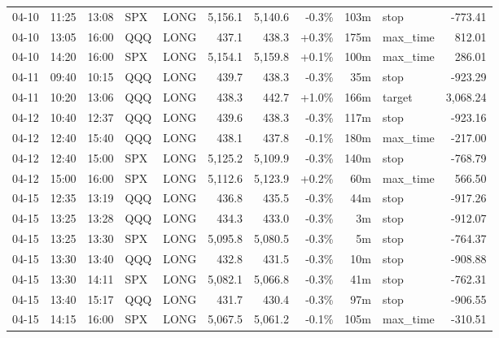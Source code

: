 \documentclass[11pt,a4paper,twoside]{article}
\begin{document}
\begin{center}
\begin{longtable}{>{\color{txtmain}}l l l l l r r r r >{\color{txtmain}}l r}
04-10 & 11:25 & 13:08 & SPX & LONG & 5,156.1 & 5,140.6 & \textcolor{lossred}{-0.3\%} & 103m & stop & \textcolor{lossred}{-773.41} \\
04-10 & 13:05 & 16:00 & QQQ & LONG & 437.1 & 438.3 & \textcolor{wingreen}{+0.3\%} & 175m & max\_time & \textcolor{wingreen}{812.01} \\
04-10 & 14:20 & 16:00 & SPX & LONG & 5,154.1 & 5,159.8 & \textcolor{wingreen}{+0.1\%} & 100m & max\_time & \textcolor{wingreen}{286.01} \\
04-11 & 09:40 & 10:15 & QQQ & LONG & 439.7 & 438.3 & \textcolor{lossred}{-0.3\%} & 35m & stop & \textcolor{lossred}{-923.29} \\
04-11 & 10:20 & 13:06 & QQQ & LONG & 438.3 & 442.7 & \textcolor{wingreen}{+1.0\%} & 166m & target & \textcolor{wingreen}{3,068.24} \\
04-12 & 10:40 & 12:37 & QQQ & LONG & 439.6 & 438.3 & \textcolor{lossred}{-0.3\%} & 117m & stop & \textcolor{lossred}{-923.16} \\
04-12 & 12:40 & 15:40 & QQQ & LONG & 438.1 & 437.8 & \textcolor{lossred}{-0.1\%} & 180m & max\_time & \textcolor{lossred}{-217.00} \\
04-12 & 12:40 & 15:00 & SPX & LONG & 5,125.2 & 5,109.9 & \textcolor{lossred}{-0.3\%} & 140m & stop & \textcolor{lossred}{-768.79} \\
04-12 & 15:00 & 16:00 & SPX & LONG & 5,112.6 & 5,123.9 & \textcolor{wingreen}{+0.2\%} & 60m & max\_time & \textcolor{wingreen}{566.50} \\
04-15 & 12:35 & 13:19 & QQQ & LONG & 436.8 & 435.5 & \textcolor{lossred}{-0.3\%} & 44m & stop & \textcolor{lossred}{-917.26} \\
04-15 & 13:25 & 13:28 & QQQ & LONG & 434.3 & 433.0 & \textcolor{lossred}{-0.3\%} & 3m & stop & \textcolor{lossred}{-912.07} \\
04-15 & 13:25 & 13:30 & SPX & LONG & 5,095.8 & 5,080.5 & \textcolor{lossred}{-0.3\%} & 5m & stop & \textcolor{lossred}{-764.37} \\
04-15 & 13:30 & 13:40 & QQQ & LONG & 432.8 & 431.5 & \textcolor{lossred}{-0.3\%} & 10m & stop & \textcolor{lossred}{-908.88} \\
04-15 & 13:30 & 14:11 & SPX & LONG & 5,082.1 & 5,066.8 & \textcolor{lossred}{-0.3\%} & 41m & stop & \textcolor{lossred}{-762.31} \\
04-15 & 13:40 & 15:17 & QQQ & LONG & 431.7 & 430.4 & \textcolor{lossred}{-0.3\%} & 97m & stop & \textcolor{lossred}{-906.55} \\
04-15 & 14:15 & 16:00 & SPX & LONG & 5,067.5 & 5,061.2 & \textcolor{lossred}{-0.1\%} & 105m & max\_time & \textcolor{lossred}{-310.51} \\

\end{longtable}
\end{center}
\end{document}
